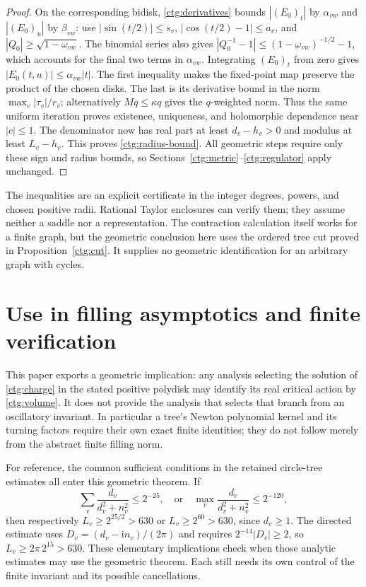 \documentclass[11pt]{article}
\numberwithin{equation}{section}
\theoremstyle{definition}
\theoremstyle{remark}
\newcommand{\ii}{\mathrm i}
\begin{document}
\begin{proof}
On the corresponding bidisk, \eqref{ctg:derivatives} bounds
$|(E_0)_t|$ by $\alpha_{vw}$ and $|(E_0)_u|$ by $\beta_{vw}$:
use $|\sin(t/2)|\le s_v$, $|\cos(t/2)-1|\le a_v$, and
$|Q_0|\ge\sqrt{1-\omega_{vw}}$. The binomial series also gives
$|Q_0^{-1}-1|\le(1-\omega_{vw})^{-1/2}-1$, which accounts for
the final two terms in $\alpha_{vw}$. Integrating $(E_0)_t$ from zero
gives $|E_0(t,u)|\le\alpha_{vw}|t|$.
The first inequality makes the fixed-point map preserve the product
of the chosen disks. The last is its derivative bound in the norm
$\max_v|\tau_v|/r_v$; alternatively $Mq\le\kappa q$ gives the
$q$-weighted norm. Thus the same uniform iteration proves existence,
uniqueness, and holomorphic dependence near $|c|\le1$.
The denominator now has real part at least $d_v-h_v>0$ and modulus
at least $L_v-h_v$. This proves \eqref{ctg:radius-bound}.
All geometric steps require only these sign and radius bounds, so
Sections~\ref{ctg:metric}--\ref{ctg:regulator} apply unchanged.
\end{proof}

The inequalities are an explicit certificate in the integer degrees,
powers, and chosen positive radii. Rational Taylor enclosures can
verify them; they assume neither a saddle nor a representation.
The contraction calculation itself works for a finite graph, but
the geometric conclusion here uses the ordered tree cut proved in
Proposition~\ref{ctg:cut}. It supplies no geometric identification
for an arbitrary graph with cycles.

\section{Use in filling asymptotics and finite verification}
\label{ctg:scope}

This paper exports a geometric implication: any analysis selecting
the solution of \eqref{ctg:charge} in the stated positive polydisk
may identify its real critical action by \eqref{ctg:volume}.
It does not provide the analysis that selects that branch from an
oscillatory invariant. In particular a tree's Newton polynomial
kernel and its turning factors require their own exact finite identities;
they do not follow merely from the abstract finite filling norm.

For reference, the common sufficient conditions in the retained
circle-tree estimates all enter this geometric theorem. If
\[
 \sum_v\frac{d_v}{d_v^2+n_v^2}\le2^{-25},
 \quad\text{or}\quad
 \max_v\frac{d_v}{d_v^2+n_v^2}\le2^{-120},
\]
then respectively $L_v\ge2^{25/2}>630$ or $L_v\ge2^{60}>630$,
since $d_v\ge1$. The directed estimate uses
$D_v=(d_v-\ii n_v)/(2\pi)$ and requires
$2^{-14}|D_v|\ge2$, so $L_v\ge2\pi\,2^{15}>630$.
These elementary implications check when those analytic estimates
may use the geometric theorem. Each still needs its own control of
the finite invariant and its possible cancellations.
\end{document}
